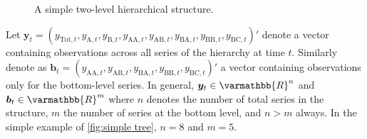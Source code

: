 \documentclass[graybox]{svmult}
\begin{document}
\begin{figure}[!hbt]\sidecaption[t]\centering
	\caption{A simple two-level hierarchical structure.}
	\label{fig:simple tree}
\end{figure}

Let $\bm{y}_t = (y_{\text{Tot},t},y_{\text{A},t}, y_{\text{B},t},y_{\text{AA},t}, y_{\text{AB},t}, y_{\text{BA},t}, y_{\text{BB},t},y_{\text{BC},t})'$ denote a vector containing observations across all series of the hierarchy at time $t$. Similarly denote as $\bm{b}_t = (y_{\text{AA},t}, y_{\text{AB},t}, y_{\text{BA},t}, y_{\text{BB},t}, y_{\text{BC},t})'$ a vector containing observations only for the bottom-level series. In general, $\bm{y}_t\in \varmathbb{R}^n$ and $\bm{b}_t \in \varmathbb{R}^m$ where $n$ denotes the number of total series in the structure, $m$ the number of series at the bottom level, and $n>m$ always. In the simple example of \autoref{fig:simple tree}, $n=8$ and $m=5$.
\end{document}
